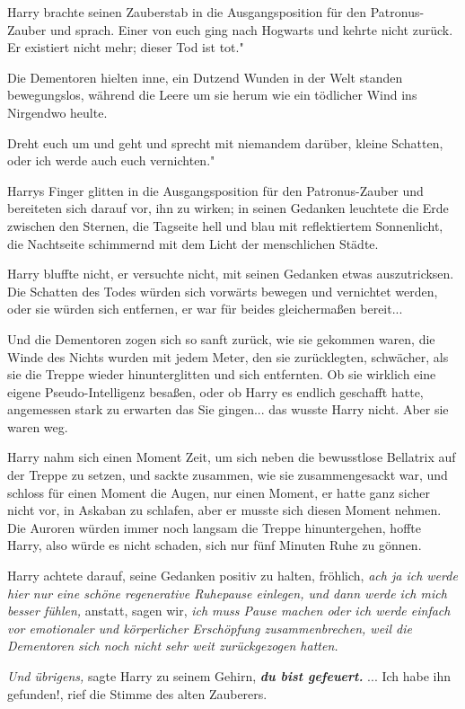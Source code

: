 Harry brachte seinen Zauberstab in die Ausgangsposition für den Patronus-Zauber
und sprach. \glqq Einer von euch ging nach Hogwarts und kehrte nicht zurück. Er
existiert nicht mehr; dieser Tod ist tot."

Die Dementoren hielten inne, ein Dutzend Wunden in der Welt standen
bewegungslos, während die Leere um sie herum wie ein tödlicher Wind ins
Nirgendwo heulte.

\glqq Dreht euch um und geht und sprecht mit niemandem darüber, kleine Schatten,
oder ich werde auch euch vernichten."

Harrys Finger glitten in die Ausgangsposition für den Patronus-Zauber und
bereiteten sich darauf vor, ihn zu wirken; in seinen Gedanken leuchtete die Erde
zwischen den Sternen, die Tagseite hell und blau mit reflektiertem Sonnenlicht,
die Nachtseite schimmernd mit dem Licht der menschlichen Städte.

Harry bluffte nicht, er versuchte nicht, mit seinen Gedanken etwas
auszutricksen. Die Schatten des Todes würden sich vorwärts bewegen und
vernichtet werden, oder sie würden sich entfernen, er war für beides
gleichermaßen bereit...

Und die Dementoren zogen sich so sanft zurück, wie sie gekommen waren, die Winde
des Nichts wurden mit jedem Meter, den sie zurücklegten, schwächer, als sie die
Treppe wieder hinunterglitten und sich entfernten. Ob sie wirklich eine eigene
Pseudo-Intelligenz besaßen, oder ob Harry es endlich geschafft hatte, angemessen
stark zu erwarten das Sie gingen... das wusste Harry nicht. Aber sie waren weg.

Harry nahm sich einen Moment Zeit, um sich neben die bewusstlose Bellatrix auf
der Treppe zu setzen, und sackte zusammen, wie sie zusammengesackt war, und
schloss für einen Moment die Augen, nur einen Moment, er hatte ganz sicher nicht
vor, in Askaban zu schlafen, aber er musste sich diesen Moment nehmen. Die
Auroren würden immer noch langsam die Treppe hinuntergehen, hoffte Harry, also
würde es nicht schaden, sich nur fünf Minuten Ruhe zu gönnen.

Harry achtete darauf, seine Gedanken positiv zu halten, fröhlich, \emph{ach ja
ich werde hier nur eine schöne regenerative Ruhepause einlegen, und dann werde
ich mich besser fühlen,} anstatt, sagen wir, \emph{ich muss Pause machen oder
ich werde einfach vor emotionaler und körperlicher Erschöpfung zusammenbrechen,
weil die Dementoren sich noch nicht sehr weit zurückgezogen hatten.}

\emph{Und übrigens,} sagte Harry zu seinem Gehirn, \textbf{\emph{du bist
gefeuert. }}
\textbf{}
\textbf{}
... \glqq Ich habe ihn gefunden!\grqq{}, rief die Stimme des alten Zauberers.

